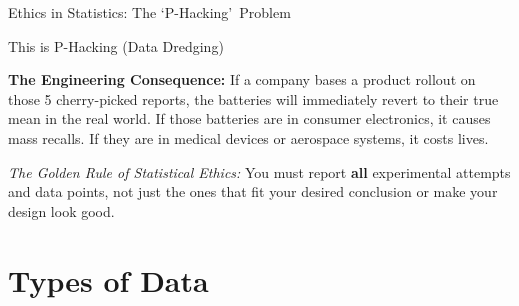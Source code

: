 \begin{frame}[allowframebreaks]{Ethics in Statistics: The \lq P-Hacking\rq\ Problem}
\begin{block}{This is P-Hacking (Data Dredging)}
{            \vspace{0.2cm}
            \textbf{The Engineering Consequence:} If a company bases a product rollout on those 5 cherry-picked reports, the batteries will immediately revert to their true mean in the real world. If those batteries are in consumer electronics, it causes mass recalls. If they are in medical devices or aerospace systems, it costs lives. 
            
            \vspace{0.2cm}
            \textit{The Golden Rule of Statistical Ethics:} You must report \textbf{all} experimental attempts and data points, not just the ones that fit your desired conclusion or make your design look good.
        }
    \end{block}
\end{frame}

\section{Types of Data}



